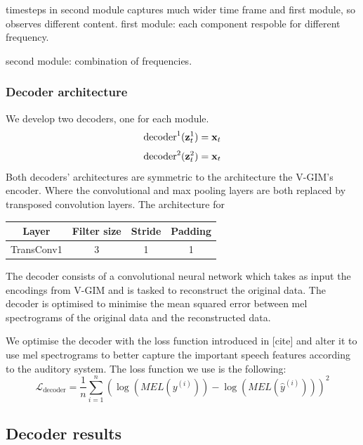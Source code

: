 		timesteps in second module captures much wider time frame and first module, so observes different content.
		first module: each component respoble for different frequency.
		
		second module:
		combination of frequencies.
		
		\subsubsection{Decoder architecture}
		We develop two decoders, one for each module. 
		$$
			\text{decoder}^1(\mathbf{z}_t^1) = \mathbf{x}_t
		$$
		$$
			\text{decoder}^2(\mathbf{z}_t^2) = \mathbf{x}_t
		$$
		Both decoders' architectures are symmetric to the architecture the V-GIM's encoder. Where the convolutional and max pooling layers are both replaced by transposed convolution layers.
		The architecture for 
		
		\begin{tabular}{|c|c|c|c|}
			\hline
			Layer & Filter size & Stride & Padding \\
			\hline
			TransConv1 & 3 & 1 & 1 \\
			\hline
		\end{tabular}
	
	
	
		The decoder consists of a convolutional neural network which takes as input the encodings from V-GIM and is tasked to reconstruct the original data. The decoder is optimised to minimise the mean squared error between mel spectrograms of the original data and the reconstructed data. 
		
		We optimise the decoder with the loss function introduced in [cite] and alter it to use mel spectrograms to better capture the important speech features according to the auditory system. The loss function we use is the following:
		$$
		\mathcal{L}_{\text{decoder}} =\frac{1}{n} \sum_{i=1}^n\left( \log (MEL(y^{(i)})) -\log (MEL(\hat{y} ^{(i)} )) \right)^2
		$$
		
		
		\subsection{Decoder results}
		
		
		
	
	
	
	
	
